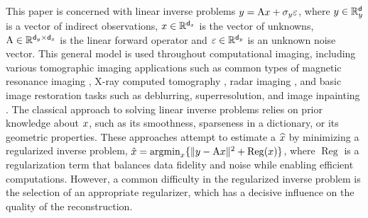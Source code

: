 This paper is concerned with  linear inverse problems $y =\mathrm{A} x+ \sigma_y \varepsilon$, where $y \in \mathbb{R}^\mathsf{d}_y$ is a vector of indirect observations, $x \in \mathbb{R}^{{\mathsf{d}_x}}$ is the vector of unknowns,  $\mathrm{A} \in \mathbb{R}^{\mathsf{d}_y \times {\mathsf{d}_x}}$ is the linear forward operator and $\varepsilon \in \mathbb{R}^{\mathsf{d}_y}$ is an unknown noise vector. This general model is used throughout computational imaging, including various tomographic imaging applications such as common types of magnetic resonance imaging \cite{vlaardingerbroek2013magnetic}, X-ray computed tomography \cite{elbakri2002statistical}, radar imaging \cite{cheney2009fundamentals}, and basic image restoration tasks such as deblurring, superresolution, and image inpainting \cite{gonzalez2009digitalIP}.
The classical approach to solving linear inverse problems relies on prior knowledge about $x$, such as its smoothness, sparseness in a dictionary, or its geometric properties.
These approaches attempt to estimate a $\widehat{x}$ by minimizing a regularized inverse problem, $\hat{x}= \operatorname{argmin}_{x} \{ \| y - \mathrm{A} x \|^2 + \operatorname{Reg}(x) \}$, where $\operatorname{Reg}$ is a regularization term that balances data fidelity and noise while enabling efficient computations. 
However, a common difficulty in the regularized inverse problem is the selection of an appropriate regularizer, which has a decisive influence on the quality of the reconstruction.

